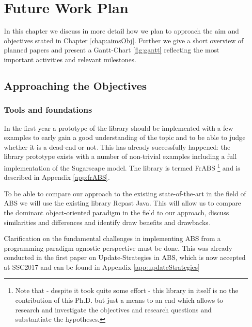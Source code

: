 \chapter{Future Work Plan}
\label{chap:future}

In this chapter we discuss in more detail how we plan to approach the aim and objectives stated in Chapter \ref{chap:aimsObj}. Further we give a short overview of planned papers and present a Gantt-Chart \ref{fig:gantt} reflecting the most important activities and relevant milestones.

\section{Approaching the Objectives}

\subsection{Tools and foundations}
In the first year a prototype of the library should be implemented with a few examples to early gain a good understanding of the topic and to be able to judge whether it is a dead-end or not. This has already successfully happened: the library prototype exists with a number of non-trivial examples including a full implementation of the Sugarscape model. The library is termed FrABS \footnote{Note that - despite it took quite some effort - this library in itself is no the contribution of this Ph.D. but just a means to an end which allows to research and investigate the objectives and research questions and substantiate the hypotheses.} and is described in Appendix \ref{app:frABS}.

To be able to compare our approach to the existing state-of-the-art in the field of ABS we will use the existing library Repast Java. This will allow us to compare the dominant object-oriented paradigm in the field to our approach, discuss similarities and differences and identify draw benefits and drawbacks. 

Clarification on the fundamental challenges in implementing ABS from a programming-paradigm agnostic perspective must be done. This was already conducted in the first paper on Update-Strategies in ABS, which is now accepted at SSC2017 and can be found in Appendix \ref{app:updateStrategies}

